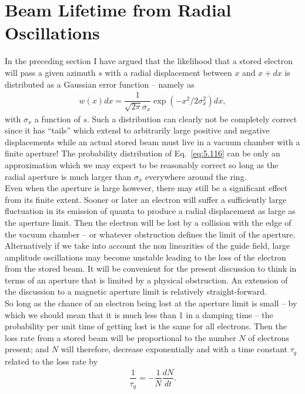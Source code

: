 \documentclass[../sands-adaptation.tex]{subfiles}
\begin{document}
\section{Beam Lifetime from Radial Oscillations} \label{eq:5.7}

In the preceding section I have argued that the likelihood that a stored electron will pass a given
 azimuth $s$ with a radial displacement between $x$ and $x + dx$ is distributed as a Gaussian error
 function -- namely as
\begin{align}\label{eq:5.116}
	w(x)dx = \dfrac{1}{\sqrt{2\pi}\sigma_x} \exp\left( -x^2/2\sigma_x^2 \right)dx,
\end{align}
with $\sigma_x$ a function of $s$. Such a distribution can clearly not be completely correct
since it has ``tails'' which extend to arbitrarily large positive and negative displacements while an actual stored beam must live in a vacuum chamber with a finite aperture! The probability
 distribution of Eq.~\eqref{eq:5.116} can be only an approximation which we may expect to be reasonably correct so long as the radial aperture is much larger than $\sigma_x$ everywhere around the ring.\\
Even when the aperture is large however, there may still be a significant effect from its finite extent. Sooner or later an electron will suffer a sufficiently large fluctuation in its emission of quanta to produce a radial displacement as large as the aperture limit. Then the electron will be lost by a collision with the edge of the vacuum chamber -- or whatever obstruction defines the limit of the aperture. Alternatively if we take into account the non linearities of the guide field, large amplitude oscillations may become unstable leading to the loss of the electron from the stored beam. It will be convenient for the present discussion to think in terms of an aperture
 that is limited by a physical obstruction. An extension of the discussion to a magnetic aperture
 limit is relatively straight-forward.\\
 So long as the chance of an electron being lost at the aperture limit is small -- by which we should mean that it is much less than 1 in a damping time -- the probability per unit time of getting lost is the same for all electrons. Then the loss rate from a stored beam will be proportional to the number $N$ of electrons present; and $N$ will therefore, decrease exponentially
 and with a time constant $\tau_q$ related to the loss rate by
\begin{align}
	\dfrac{1}{\tau_q} = - \dfrac{1}{N} \dfrac{dN}{dt}.
\end{align}
\end{document}
